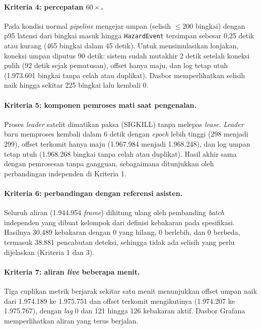 \paragraph*{Kriteria 4: percepatan $60\times$.}
Pada kondisi normal \textit{pipeline} mengejar umpan (selisih $\le 200$ bingkai) dengan p95 latensi dari bingkai masuk hingga \texttt{HazardEvent} tersimpan sebesar 0,25 detik atau kurang (465 bingkai dalam 45 detik). Untuk mensimulasikan lonjakan, koneksi umpan diputus 90 detik: sistem sudah mutakhir 2 detik setelah koneksi pulih (92 detik sejak pemutusan), offset hanya maju, dan log tetap utuh (1.973.601 bingkai tanpa celah atau duplikat). Dasbor memperlihatkan selisih naik hingga sekitar 225 bingkai lalu kembali 0.

\paragraph*{Kriteria 5: komponen pemroses mati saat pengenalan.}
Proses \textit{leader} satelit dimatikan paksa (SIGKILL) tanpa melepas \textit{lease}. \textit{Leader} baru memproses kembali dalam 6 detik dengan \textit{epoch} lebih tinggi (298 menjadi 299), offset terkomit hanya maju (1.967.984 menjadi 1.968.248), dan log umpan tetap utuh (1.968.268 bingkai tanpa celah atau duplikat). Hasil akhir sama dengan pemrosesan tanpa gangguan, sebagaimana ditunjukkan oleh perbandingan independen di Kriteria 1.

\paragraph*{Kriteria 6: perbandingan dengan referensi asisten.}
Seluruh aliran (1.944.954 \textit{frame}) dihitung ulang oleh pembanding \textit{batch} independen yang dibuat kelompok dari definisi kebakaran pada spesifikasi. Hasilnya 30.489 kebakaran dengan 0 yang hilang, 0 berlebih, dan 0 berbeda, termasuk 38.881 pencabutan deteksi, sehingga tidak ada selisih yang perlu dijelaskan (Kriteria 1 dan 3).

\paragraph*{Kriteria 7: aliran \textit{live} beberapa menit.}
Tiga cuplikan metrik berjarak sekitar satu menit menunjukkan offset umpan naik dari 1.974.189 ke 1.975.751 dan offset terkomit mengikutinya (1.974.207 ke 1.975.767), dengan \textit{lag} 0 dan 121 hingga 126 kebakaran aktif. Dasbor Grafana memperlihatkan aliran yang terus berjalan.

